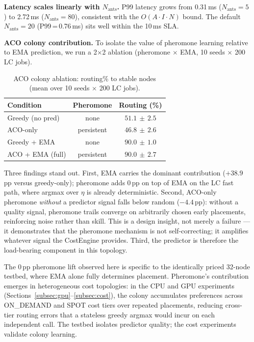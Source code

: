 \documentclass[conference]{IEEEtran}
\begin{document}
\textbf{Latency scales linearly with $N_{\text{ants}}$.} P99 latency
grows from 0.31\,ms ($N_{\text{ants}}{=}5$) to 2.72\,ms
($N_{\text{ants}}{=}80$), consistent with the $O(A{\cdot}I{\cdot}N)$
bound. The default $N_{\text{ants}}{=}20$ (P99\,=\,0.76\,ms) sits well
within the 10\,ms SLA.

\textbf{ACO colony contribution.} To isolate the value of pheromone
learning relative to EMA prediction, we run a 2$\times$2 ablation
(pheromone $\times$ EMA, 10 seeds $\times$ 200 LC jobs).

\begin{table}[t]
\caption{ACO colony ablation: routing\% to stable nodes
(mean over 10 seeds $\times$ 200 LC jobs).}
\label{tab:aco_ablation}
\begin{center}
\begin{tabular}{lcc}
\toprule
\textbf{Condition} & \textbf{Pheromone} & \textbf{Routing (\%)} \\
\midrule
Greedy (no pred)  & none       & $51.1\,{\pm}\,2.5$ \\
ACO-only          & persistent & $46.8\,{\pm}\,2.6$ \\
Greedy + EMA      & none       & $90.0\,{\pm}\,1.0$ \\
ACO + EMA (full)  & persistent & $90.0\,{\pm}\,2.7$ \\
\bottomrule
\end{tabular}
\end{center}
\end{table}

Three findings stand out. First, EMA carries the dominant contribution
($+38.9$\,pp versus greedy-only); pheromone adds $0$\,pp on top of EMA
on the LC fast path, where argmax over $\eta$ is already deterministic.
Second, ACO-only pheromone \emph{without} a predictor signal falls below
random ($-4.4$\,pp): without a quality signal, pheromone trails converge
on arbitrarily chosen early placements, reinforcing noise rather than
skill. This is a design insight, not merely a failure --- it demonstrates
that the pheromone mechanism is not self-correcting; it amplifies whatever
signal the CostEngine provides. Third, the predictor is therefore the
load-bearing component in this topology.

The 0\,pp pheromone lift observed here is specific to the identically
priced 32-node testbed, where EMA alone fully determines placement.
Pheromone's contribution emerges in heterogeneous cost topologies: in the
CPU and GPU experiments (Sections~\ref{subsec:gpu}--\ref{subsec:cost}),
the colony accumulates preferences across ON\_DEMAND and SPOT cost tiers
over repeated placements, reducing cross-tier routing errors that a
stateless greedy argmax would incur on each independent call. The testbed
isolates predictor quality; the cost experiments validate colony learning.
\end{document}
